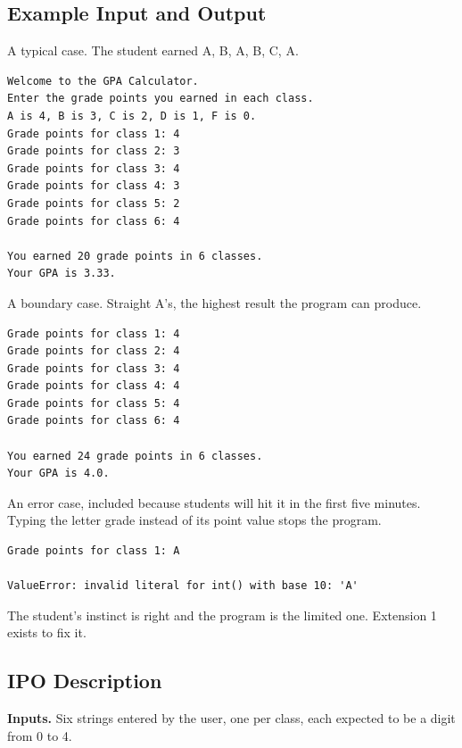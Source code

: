 \documentclass[11pt]{article}
\begin{document}
\subsection{Example Input and Output}
\label{sec:orge724471}

A typical case. The student earned A, B, A, B, C, A.\\

\begin{verbatim}
Welcome to the GPA Calculator.
Enter the grade points you earned in each class.
A is 4, B is 3, C is 2, D is 1, F is 0.
Grade points for class 1: 4
Grade points for class 2: 3
Grade points for class 3: 4
Grade points for class 4: 3
Grade points for class 5: 2
Grade points for class 6: 4

You earned 20 grade points in 6 classes.
Your GPA is 3.33.
\end{verbatim}

A boundary case. Straight A's, the highest result the program can produce.\\

\begin{verbatim}
Grade points for class 1: 4
Grade points for class 2: 4
Grade points for class 3: 4
Grade points for class 4: 4
Grade points for class 5: 4
Grade points for class 6: 4

You earned 24 grade points in 6 classes.
Your GPA is 4.0.
\end{verbatim}

An error case, included because students will hit it in the first five minutes. Typing the letter grade instead of its point value stops the program.\\

\begin{verbatim}
Grade points for class 1: A

ValueError: invalid literal for int() with base 10: 'A'
\end{verbatim}

The student's instinct is right and the program is the limited one. Extension 1 exists to fix it.\\
\subsection{IPO Description}
\label{sec:org5f1f227}

\textbf{Inputs.} Six strings entered by the user, one per class, each expected to be a digit from 0 to 4.\\
\end{document}
